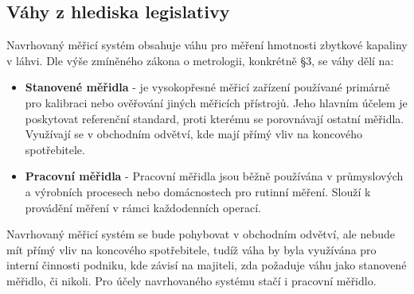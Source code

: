 \subsection{Váhy z hlediska legislativy}
Navrhovaný měřicí systém obsahuje váhu pro měření hmotnosti zbytkové kapaliny v láhvi. Dle výše zmíněného zákona o metrologii, konkrétně §3, se váhy dělí na:
\begin{itemize}
    \item \textbf{Stanovené měřidla} - je vysokopřesné měřicí zařízení používané primárně pro kalibraci nebo ověřování jiných měřicích přístrojů. Jeho hlavním účelem je poskytovat referenční standard, proti kterému se porovnávají ostatní měřidla. Využívají se v obchodním odvětví, kde mají přímý vliv na koncového spotřebitele. \cite{Zákon o metrologii}
    \item \textbf{Pracovní měřidla} - Pracovní měřidla jsou běžně používána v průmyslových a výrobních procesech nebo domácnostech pro rutinní měření. Slouží k provádění měření v rámci každodenních operací. \cite{Zákon o metrologii}
\end{itemize}
\smallskip
Navrhovaný měřicí systém se bude pohybovat v obchodním odvětví, ale nebude mít přímý vliv na koncového spotřebitele, tudíž váha by byla využívána pro interní činnosti podniku, kde závisí na majiteli, zda požaduje váhu jako stanovené měřidlo, či nikoli. Pro účely navrhovaného systému stačí i pracovní měřidlo.\cite{použití elektronických vah v obchodním styku}


